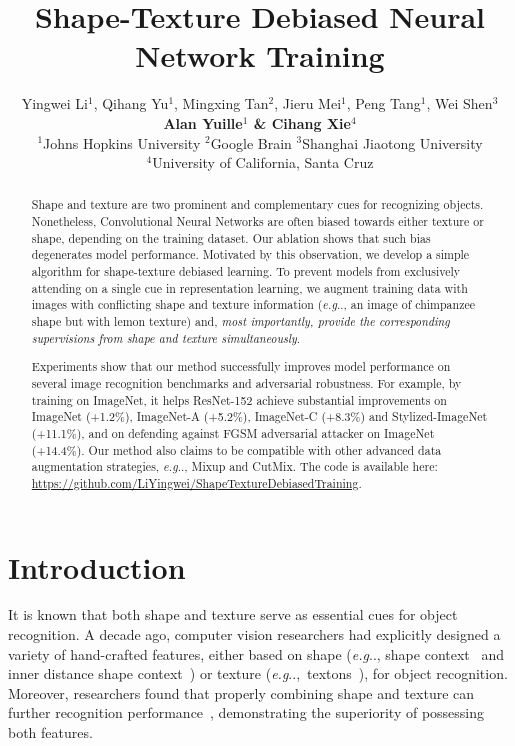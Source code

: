\documentclass{article} \usepackage{iclr2021_conference,times}
\title{Shape-Texture Debiased Neural Network Training}
\author{Yingwei Li$^1$, Qihang Yu$^1$, Mingxing Tan$^2$, Jieru Mei$^1$, Peng Tang$^1$, Wei Shen$^3$\\
\textbf{Alan Yuille$^1$ \& Cihang Xie$^4$} \vspace{.3em}\\
$^1$Johns Hopkins University \quad
$^2$Google Brain \quad 
$^3$Shanghai Jiaotong University \quad \\
$^4$University of California, Santa Cruz \vspace{-0.5em}
}
\makeatletter
\DeclareRobustCommand\onedot{\futurelet\@let@token\@onedot}
\def\@onedot{\ifx\@let@token.\else.\null\fi\xspace}
\def\eg{\emph{e.g}\onedot} \def\Eg{\emph{E.g}\onedot}
\makeatother
\begin{document}
\maketitle

\begin{abstract}
    Shape and texture are two prominent and complementary cues for recognizing objects. 
    Nonetheless, Convolutional Neural Networks are often biased towards either texture or shape, depending on the training dataset.
    Our ablation shows that such bias degenerates model performance. 
    Motivated by this observation, we develop a simple algorithm for shape-texture debiased learning.
    To prevent models from exclusively attending on a single cue in representation learning, we augment training data with images with conflicting shape and texture information (\eg, an image of chimpanzee shape but with lemon texture) and, \emph{most importantly, provide the corresponding supervisions from shape and texture simultaneously}. 
   
    Experiments show that our method successfully improves model performance on several image recognition benchmarks and adversarial robustness. For example, by training on ImageNet, it helps ResNet-152 achieve substantial improvements on ImageNet (+1.2\%), ImageNet-A  (+5.2\%), ImageNet-C (+8.3\%) and Stylized-ImageNet (+11.1\%), and on defending against FGSM adversarial attacker on ImageNet (+14.4\%). Our method also claims to be compatible with other advanced data augmentation strategies, \eg, Mixup and CutMix. The code is available here: \url{https://github.com/LiYingwei/ShapeTextureDebiasedTraining}.
\end{abstract}


\section{Introduction}
It is known that both shape and texture serve as essential cues for object recognition. 
A decade ago, computer vision researchers had explicitly designed a variety of hand-crafted features, either based on shape (\eg, shape context~\citep{belongie2002shape} and inner distance shape context~\citep{ling2007shape}) or texture (\eg,~textons~\citep{MalikBLS01}), for object recognition. 
Moreover, researchers found that properly combining shape and texture can further recognition performance~\citep{shotton2009textonboost,ZhengTY07}, demonstrating the superiority of possessing both features.
\end{document}
